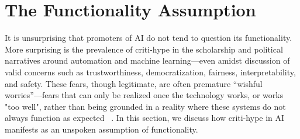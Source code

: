 \documentclass[acmconf,manuscript,screen,natbib=true]{acmart}
\begin{document}




\section{The Functionality Assumption}
\label{assumption}


It is unsurprising that promoters of AI
do not tend to question its functionality.
More surprising is the prevalence of criti-hype in the scholarship and political narratives around automation and machine learning---even amidst discussion of valid concerns such as trustworthiness, democratization, fairness, interpretability, and safety. These fears, though legitimate, are often premature “wishful worries”---fears that can only be realized once the technology works, or works "too well", rather than being grounded in a reality where these systems do not always function as expected ~\cite{vinsel_critihype}.
In this section, we discuss how criti-hype in AI  manifests as an unspoken assumption of functionality. %

\end{document}
